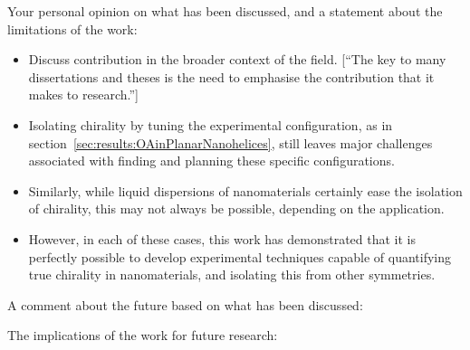 Your personal opinion on what has been discussed, and a statement about the limitations of the work:
\begin{itemize}
    \item Discuss contribution in the broader context of the field. [``The key to many dissertations and theses is the need to emphasise the contribution that it makes to research.'']
    \item Isolating chirality by tuning the experimental configuration, as in section~\ref{sec:results:OAinPlanarNanohelices}, still leaves major challenges associated with finding and planning these specific configurations.
    \item Similarly, while liquid dispersions of nanomaterials certainly ease the isolation of chirality, this may not always be possible, depending on the application.
    \item However, in each of these cases, this work has demonstrated that it is perfectly possible to develop experimental techniques capable of quantifying true chirality in nanomaterials, and isolating this from other symmetries.
\end{itemize}

A comment about the future based on what has been discussed:

The implications of the work for future research:


\color{black}